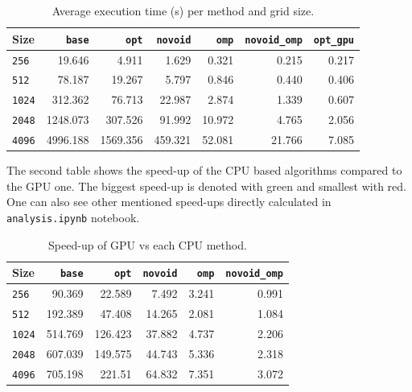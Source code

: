 \documentclass[11pt]{article}
\begin{document}
\begin{table}[H]
    \centering
    \begin{tabular}{|l|r|r|r|r|r|r|} \hline
        \cellcolor{blue!20}\textbf{Size} & \cellcolor{blue!20}\texttt{base} & \cellcolor{blue!20}\texttt{opt} & \cellcolor{blue!20}\texttt{novoid} & \cellcolor{blue!20}\texttt{omp} & \cellcolor{blue!20}\texttt{novoid\_omp} & \cellcolor{blue!20}\texttt{opt\_gpu} \\ \hline
        \texttt{256}  & \cellcolor{red!20}19.646  & 4.911   & 1.629   & 0.321  & 0.215 & \cellcolor{green!20}0.217  \\ \hline
        \texttt{512}  & \cellcolor{red!20}78.187  & 19.267  & 5.797   & 0.846  & 0.440 & \cellcolor{green!20}0.406  \\ \hline
        \texttt{1024} & \cellcolor{red!20}312.362 & 76.713  & 22.987  & 2.874  & 1.339 & \cellcolor{green!20}0.607  \\ \hline
        \texttt{2048} & \cellcolor{red!20}1248.073 & 307.526 & 91.992  & 10.972 & 4.765 & \cellcolor{green!20}2.056  \\ \hline
        \texttt{4096} & \cellcolor{red!20}4996.188 & 1569.356 & 459.321 & 52.081 & 21.766 & \cellcolor{green!20}7.085  \\ \hline
    \end{tabular}
    \caption{Average execution time (s) per method and grid size.}
\end{table}

The second table shows the speed-up of the CPU based algorithms compared to the GPU one. The biggest speed-up is denoted with green and smallest with red. One can also see other mentioned speed-ups directly calculated in \texttt{analysis.ipynb} notebook.

\begin{table}[H]
    \centering
    \begin{tabular}{|l|r|r|r|r|r|} \hline
        \cellcolor{blue!20}\textbf{Size} & \cellcolor{blue!20}\texttt{base} & \cellcolor{blue!20}\texttt{opt} & \cellcolor{blue!20}\texttt{novoid} & \cellcolor{blue!20}\texttt{omp} & \cellcolor{blue!20}\texttt{novoid\_omp} \\ \hline
        \texttt{256}  & \cellcolor{green!20}90.369  & 22.589  & 7.492 & 3.241 & \cellcolor{red!20}0.991  \\ \hline
        \texttt{512}  & \cellcolor{green!20}192.389 & 47.408  & 14.265 & 2.081 & \cellcolor{red!20}1.084  \\ \hline
        \texttt{1024} & \cellcolor{green!20}514.769 & 126.423 & 37.882 & 4.737 & \cellcolor{red!20}2.206  \\ \hline
        \texttt{2048} & \cellcolor{green!20}607.039 & 149.575 & 44.743 & 5.336 & \cellcolor{red!20}2.318  \\ \hline
        \texttt{4096} & \cellcolor{green!20}705.198 & 221.51 & 64.832 & 7.351 & \cellcolor{red!20}3.072  \\ \hline
    \end{tabular}
    \caption{Speed-up of GPU vs each CPU method.}
\end{table}
\end{document}
